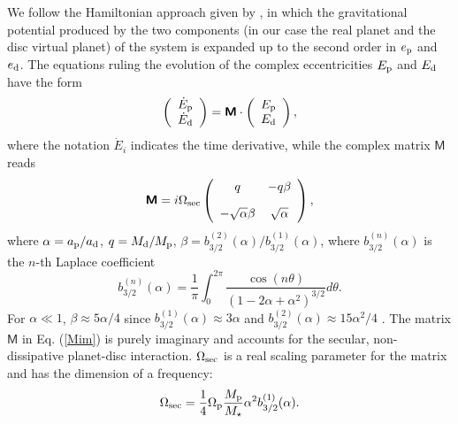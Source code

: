 \documentclass[usenatbib,a4paper,times,fleqn]{mnras}
\begin{document}
We follow the Hamiltonian approach given by \citet{zhang2013}, in which the gravitational potential produced by the two components (in our case the real planet and the disc virtual planet) of the system is expanded up to the second order in $e_{\rm p}$ and $e_{\rm d}$. The equations ruling the evolution of the complex eccentricities $E_{\rm p}$ and $E_{\rm d}$ have the form
\begin{equation}
 \left(\begin{array}{c}
 \dot E_{\rm p}\\
 \dot E_{\rm d}
 \end{array}\right)=\bm{\mathsf{M}}
   \cdot \left(\begin{array}{c}
   E_{\rm p}\\
   E_{\rm d}
   \end{array}\right),\label{ecceq}
\end{equation}
where the notation $\dot E_i$ indicates the time derivative, while the complex matrix $\bm{\mathsf{M}}$ reads
\begin{equation}
\bm{\mathsf{M}}=i\Omega_{\rm sec}
   \left(
   \begin{array}{cc}
      q & -q\beta \\[10pt]
    -\sqrt{\alpha}\beta &  \sqrt{\alpha}
   \end{array}
   \right),\label{Mim}
\end{equation}
where $\alpha=a_{\rm p}/a_{\rm d}$, $q=M_{\rm d}/M_{\rm p}$, $\beta=b^{(2)}_{3/2}(\alpha)/b^{(1)}_{3/2}(\alpha)$, where $b^{(n)}_{3/2}(\alpha)$ is the $n$-th Laplace coefficient 
\begin{equation}
b_{3/2}^{(n)}(\alpha)= \frac{1}{\pi}\int^{2\pi}_0\frac{\cos(n\theta)}{(1-2\alpha+\alpha^2)^{3/2}}d\theta.
\end{equation}
For $\alpha\ll 1$, $\beta\approx 5\alpha/4$ since $b^{(1)}_{3/2}(\alpha)\approx 3\alpha$ and $b^{(2)}_{3/2}(\alpha)\approx 15\alpha^2/4$ \citep{murray1999}.
The matrix $\bm{\mathsf{M}}$ in Eq. (\ref{Mim}) is purely imaginary and accounts for the secular, non-dissipative planet-disc interaction. $\Omega_{\rm sec}$ is a real scaling parameter for the matrix and has the dimension of a frequency:
\begin{equation}
\Omega_{\rm sec}=\frac{1}{4}\Omega_{\rm p}\frac{M_{\rm p}}{M_\star}\alpha^2b^{(1)}_{3/2}(\alpha).\label{omegasec}
\end{equation}
\end{document}
